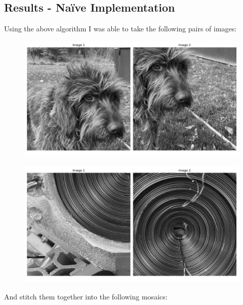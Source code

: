 \documentclass[]{article}
\begin{document}
\newpage
\subsection{Results - Na\"ive Implementation}
Using the above algorithm I was able to take the following pairs of images:
\begin{figure}[H]
	\centering
	\includegraphics[width=6.5in]{p3_output/img_0_pieces.png}
\end{figure}

\begin{figure}[H]
	\centering
	\includegraphics[width=6.5in]{p3_output/img_1_pieces.png}
\end{figure}
And stitch them together into the following mosaics:
\end{document}
